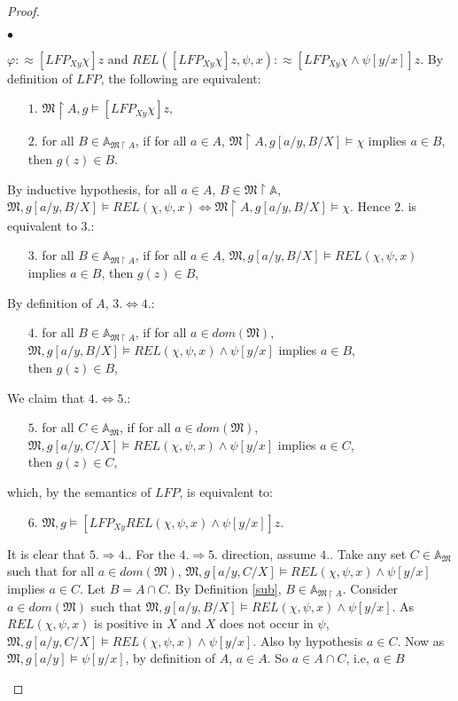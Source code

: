 \documentclass{LMCS}
\newcommand{\frM}{\mathfrak{M}}
\begin{document}
\begin{proof}
\begin{iteMize}{$\bullet$}
\item   $\varphi:\approx[LFP_{Xy}\chi]z$ and $REL([LFP_{Xy}\chi]z,\psi,x):\approx [LFP_{Xy}\chi \wedge\psi[y/x]]z$.
By definition of $LFP$, the following are equivalent:
\begin{enumerate}
\item [$1.$] $\frM \upharpoonright A, g \models [LFP_{Xy}\chi]z$,
\item [$2.$]  for all $B \in \mathbb{A}_{\frM \upharpoonright A}$, if for all $a \in A$, $\frM\upharpoonright A, g[a/y,B/X] \models \chi$ implies $a \in B$, then $g(z)\in B$.
\end{enumerate}
By inductive hypothesis, for all $a\in A$, $B \in \mathbb{\frM \upharpoonright A}$, $\frM, g[a/y,B/X] \models REL(\chi,\psi,x) \Leftrightarrow \frM \upharpoonright A, g[a/y,B/X] \models \chi$. Hence $2.$ is equivalent to $3.$:
\begin{enumerate}
\item [$3.$] for all $B \in \mathbb{A}_{\frM \upharpoonright A}$, if for all $a \in A$, $\frM, g[a/y,B/X] \models REL(\chi,\psi,x)$ implies $a \in B$, then $g(z)\in B$,
\end{enumerate}
By definition of $A$, $3. \Leftrightarrow 4.$:
\begin{enumerate}
\item [$4.$] for all $B \in \mathbb{A}_{\frM \upharpoonright A}$, if for all $a \in dom(\frM)$,\\
 $\frM, g[a/y,B/X] \models REL(\chi,\psi,x)\wedge \psi[y/x]$ implies $a \in B$,\\ then $g(z)\in B$,
\end{enumerate}
We claim that $4. \Leftrightarrow 5.$:
\begin{enumerate}
\item [$5.$] for all $C \in \mathbb{A}_\frM$, if for all $a \in dom(\frM)$,\\
 $\frM, g[a/y,C/X] \models REL(\chi,\psi,x) \wedge \psi[y/x]$ implies $a \in C$,\\
  then $g(z)\in C$,
\end{enumerate}
which, by the semantics of $LFP$, is equivalent to:
\begin{enumerate}
\item   [$6.$]$\frM, g \models [LFP_{Xy} REL(\chi,\psi,x) \wedge \psi[y/x]]z$.
\end{enumerate}
It is clear that $5. \Rightarrow 4.$. For the $4. \Rightarrow 5.$ direction, assume $4.$. Take any set $C\in \mathbb{A}_\frM$ such that for all $a \in dom(\frM)$, $\frM, g[a/y,C/X] \models REL(\chi,\psi,x) \wedge \psi[y/x]$ implies $a \in C$.  Let $B=A \cap C$. By Definition \ref{sub}, $B \in \mathbb{A}_{\frM \upharpoonright A}$. Consider $a \in dom(\frM)$ such that $\frM, g[a/y,B/X] \models REL(\chi,\psi,x) \wedge \psi[y/x]$. As $REL(\chi,\psi,x)$ is positive in $X$ and $X$ does not occur in $\psi$, $\frM, g[a/y,C/X] \models REL(\chi,\psi,x) \wedge \psi[y/x]$. Also by hypothesis $a \in C$. Now as $\frM, g[a/y] \models \psi[y/x]$, by definition of $A$, $a \in A$. So $a \in A \cap C$, i.e, $a \in B$

\end{iteMize}
\end{proof}
\end{document}
